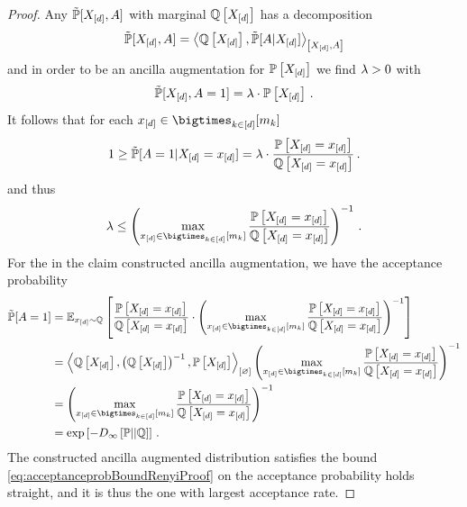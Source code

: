 \begin{proof}
    Any $\tilde{\mathbb{P}}[X_{[d]},A]$ with marginal $\mathbb{Q}\left[X_{[d]}\right]$ has a decomposition
    \begin{align*}
        \tilde{\mathbb{P}}[X_{[d]},A]
        = \left\langle \mathbb{Q}\left[X_{[d]}\right],
            \tilde{\mathbb{P}}[A|X_{[d]}]
        \right\rangle_{\left[ X_{[d]},A \right]}
    \end{align*}
    and in order to be an ancilla augmentation for $\mathbb{P}\left[X_{[d]}\right]$ we find $\lambda>0$ with
    \begin{align*}
        \tilde{\mathbb{P}}[X_{[d]},A=1]
        = \lambda \cdot \mathbb{P}\left[X_{[d]}\right] \, .
    \end{align*}
    It follows that for each $\shortcatindicesin$
    \begin{align*}
        1 \geq \tilde{\mathbb{P}}[A=1|X_{[d]}=x_{[d]}]
        = \lambda \cdot  \frac{\mathbb{P}\left[X_{[d]}=x_{[d]}\right]}{\mathbb{Q}\left[X_{[d]}=x_{[d]}\right]} \, .
    \end{align*}
    and thus
    \begin{align}
        \label{eq:acceptanceprobBoundRenyiProof}
        \acceptanceprob \leq \left(\max_{\shortcatindicesin}\frac{\probat{\indexedshortcatvariables}}{\mathbb{Q}\left[\indexedshortcatvariables\right]}\right)^{-1} \, .
    \end{align}
    For the in the claim constructed ancilla augmentation, we have the acceptance probability
    \begin{align*}
        \secprobat{\avariable=1}
        &= \mathbb{E}_{\shortcatindices\sim\mathbb{Q}}
        \left[
            \frac{\probat{\indexedshortcatvariables}}{\mathbb{Q}\left[\indexedshortcatvariables\right]} \cdot
            \left(\max_{\shortcatindicesin} \frac{\probat{\indexedshortcatvariables}}{\mathbb{Q}\left[\indexedshortcatvariables\right]}
            \right)^{-1}
        \right] \\
        &= \contraction{\mathbb{Q}\left[\shortcatvariables\right],\left(\mathbb{Q}\left[\shortcatvariables\right]\right)^{-1},\probwith}
        \left(\max_{\shortcatindicesin}
            \frac{\probat{\indexedshortcatvariables}}{\mathbb{Q}\left[\indexedshortcatvariables\right]}
        \right)^{-1} \\
        & = \left(\max_{\shortcatindicesin}
                \frac{\probat{\indexedshortcatvariables}}{\mathbb{Q}\left[\indexedshortcatvariables\right]}
        \right)^{-1}  \\
        & = \expof{-D_{\infty}\left[\probtensor||\mathbb{Q}\right]} \, .
    \end{align*}
    The constructed ancilla augmented distribution satisfies the bound \eqref{eq:acceptanceprobBoundRenyiProof} on the acceptance probability holds straight, and it is thus the one with largest acceptance rate.
\end{proof}

